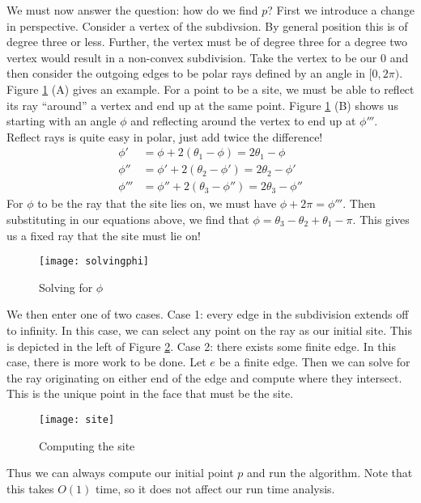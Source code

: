 \documentclass[11pt]{article}
\begin{document}
We must now answer the question: how do we find $p$?
First we introduce a change in perspective.
Consider a vertex of the subdivsion.
By general position this is of degree three or less.
Further, the vertex must be of degree three for a degree two vertex would result in a non-convex subdivision.
Take the vertex to be our 0 and then consider the outgoing edges to be polar rays defined by an angle in $[0, 2 \pi)$.
Figure \ref{fig:solvingphi} (A) gives an example.
For a point to be a site, we must be able to reflect its ray ``around'' a vertex and end up at the same point.
Figure \ref{fig:solvingphi} (B) shows us starting with an angle $\phi$ and reflecting around the vertex to end up at $\phi'''$.
Reflect rays is quite easy in polar, just add twice the difference!
\begin{align*}
    \phi ' &= \phi + 2(\theta _1 - \phi) = 2 \theta _1 - \phi \\
    \phi '' &= \phi' + 2(\theta _2 - \phi ') = 2 \theta _2 - \phi' \\
    \phi ''' &= \phi'' + 2(\theta _3 - \phi '') = 2 \theta _3 - \phi''
\end{align*}
For $\phi$ to be the ray that the site lies on, we must have $\phi + 2 \pi = \phi'''$.
Then substituting in our equations above, we find that $\phi = \theta _3 - \theta _2 + \theta _1 - \pi$.
This gives us a fixed ray that the site must lie on!

\begin{figure}[h]
    \centering
    \texttt{[image: solvingphi]}
    \caption{Solving for $\phi$}
    \label{fig:solvingphi}
\end{figure}

\newpage
We then enter one of two cases.
Case 1: every edge in the subdivision extends off to infinity.
In this case, we can select any point on the ray as our initial site.
This is depicted in the left of Figure \ref{fig:site}.
Case 2: there exists some finite edge.
In this case, there is more work to be done.
Let $e$ be a finite edge.
Then we can solve for the ray originating on either end of the edge and compute where they intersect.
This is the unique point in the face that must be the site.

\begin{figure}[h]
    \centering
    \texttt{[image: site]}
    \caption{Computing the site}
    \label{fig:site}
\end{figure}

Thus we can always compute our initial point $p$ and run the algorithm.
Note that this takes $O(1)$ time, so it does not affect our run time analysis.
\end{document}

